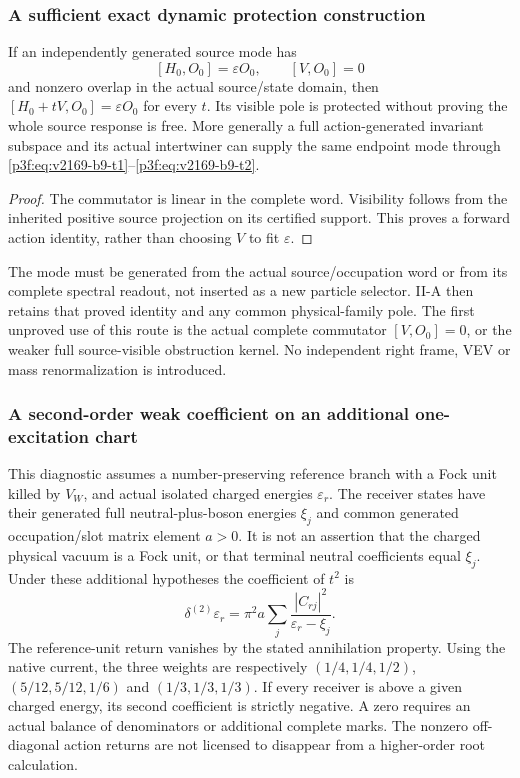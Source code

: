 \documentclass[11pt,a4paper]{article}
\begin{document}
\subsubsection{A sufficient exact dynamic protection construction}
\begin{corollary}
\label{p3f:v2169:b9:cor:intertwining}
If an independently generated source mode has
\[
 [H_0,O_0]=\varepsilon O_0,\qquad [V,O_0]=0
\]
and nonzero overlap in the actual source/state domain, then
$[H_0+tV,O_0]=\varepsilon O_0$ for every $t$. Its visible pole is protected
without proving the whole source response is free. More generally a full
action-generated invariant subspace and its actual intertwiner can supply
the same endpoint mode through \eqref{p3f:eq:v2169-b9-t1}--\eqref{p3f:eq:v2169-b9-t2}.
\end{corollary}
\begin{proof}
The commutator is linear in the complete word. Visibility follows from the
inherited positive source projection on its certified support. This proves
a forward action identity, rather than choosing $V$ to fit $\varepsilon$.
\end{proof}

The mode must be generated from the actual source/occupation word or from
its complete spectral readout, not inserted as a new particle selector.
II-A then retains that proved identity and any common physical-family pole.
The first unproved use of this route is the actual complete commutator
$[V,O_0]=0$, or the weaker full source-visible obstruction kernel.
No independent right frame, VEV or mass renormalization is introduced.


\subsubsection{A second-order weak coefficient on an additional one-excitation chart}
This diagnostic assumes a number-preserving reference branch with a Fock
unit killed by $V_W$, and actual isolated charged energies $\varepsilon_r$.
The receiver states have their generated full neutral-plus-boson energies
$\xi_j$ and common generated occupation/slot matrix element $a>0$.
It is not an assertion that the charged physical vacuum is a Fock unit, or
that terminal neutral coefficients equal $\xi_j$. Under these additional
hypotheses the coefficient of $t^2$ is
\begin{equation}
 \delta^{(2)}\varepsilon_r
 =\pi^2a\sum_j\frac{|C_{rj}|^2}{\varepsilon_r-\xi_j}.
 \label{p3f:eq:v2169-b9-t8}
\end{equation}
The reference-unit return vanishes by the stated annihilation property.
Using the native current, the three weights are respectively
$(1/4,1/4,1/2)$, $(5/12,5/12,1/6)$ and $(1/3,1/3,1/3)$.
If every receiver is above a given charged energy, its second coefficient
is strictly negative. A zero requires an actual balance of denominators or
additional complete marks. The nonzero off-diagonal action returns are not
licensed to disappear from a higher-order root calculation.
\end{document}
